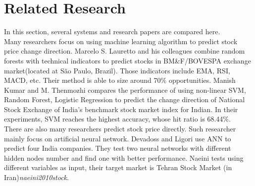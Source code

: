 \section{Related Research}
\label{sec:related_research}

In this section, several systems and research papers are compared here.\\


Many researchers focus on using machine learning algorithm to predict stock price change direction. Marcelo S. Lauretto and his colleagues combine random forests with technical indicators to predict stocks in BM\&F/BOVESPA exchange market(located at São Paulo, Brazil)\cite{lauretto2013evaluation}. Those indicators include EMA, RSI, MACD, etc. Their method is able to size around 70\% opportunities. Manish Kumar and M. Thenmozhi compares the performance of using non-linear SVM, Random Forest, Logistic Regression to predict the change direction of National Stock Exchange of India's benchmark stock market index for Indian\cite{kumar2006forecasting}. In their experiments, SVM reaches the highest accuracy, whose hit ratio is 68.44\%.\\


There are also many researchers predict stock price directly. Such researcher mainly focus on artificial neural network. Devadoss and Ligori use ANN to predict four India companies\cite{devadoss2013forecasting}. They test two neural networks with different hidden nodes number and find one with better performance. Naeini tests using different variables as input, their target market is Tehran Stock Market (in Iran)\textit{naeini2010stock}.